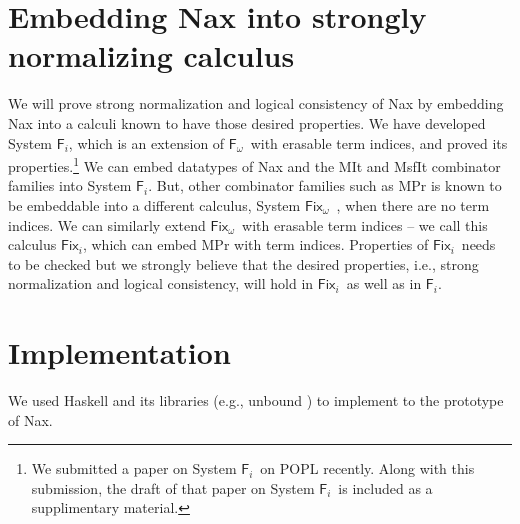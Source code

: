 \documentclass{llncs}
\newcommand{\ie}{{i.e.}}
\newcommand{\eg}{{e.g.}}
\newcommand{\Fi}{\ensuremath{\mathsf{F}_i}}
\newcommand{\Fw}{\ensuremath{\mathsf{F}_\omega}}
\newcommand{\Fix}{\mathsf{Fix}}
\newcommand{\Fixw}{\ensuremath{\Fix_{\omega}}}
\newcommand{\Fixi}{\ensuremath{\Fix_{i}}}
\begin{document}
\section{Embedding Nax into strongly normalizing calculus}\label{sec:theory}
We will prove strong normalization and logical consistency of Nax
by embedding Nax into a calculi known to have those desired properties.
We have developed System \Fi, which is an extension of \Fw\ with 
erasable term indices, and proved its properties.\footnote{
	We submitted a paper on System \Fi\ on POPL recently.
	Along with this submission, the draft of that paper on System \Fi\ is
	included as a supplimentary material.}
We can embed datatypes of Nax and the \textsf{MIt} and \textsf{MsfIt}
combinator families into System \Fi. But, other combinator families
such as \textsf{MPr} is known to be embeddable into a different
calculus, System \Fixw\ \cite{AbeMat04}, when there are no term indices.
We can similarly extend \Fixw\ with erasable term indices -- we call this
calculus \Fixi, which can embed \textsf{MPr} with term indices.
Properties of \Fixi\ needs to be checked but we strongly believe
that the desired properties, \ie, strong normalization
and logical consistency, will hold in \Fixi\ as well as in \Fi.

\section{Implementation}
We used Haskell and its libraries (\eg, unbound \cite{unbound})
to implement to the prototype of Nax.





\end{document}

